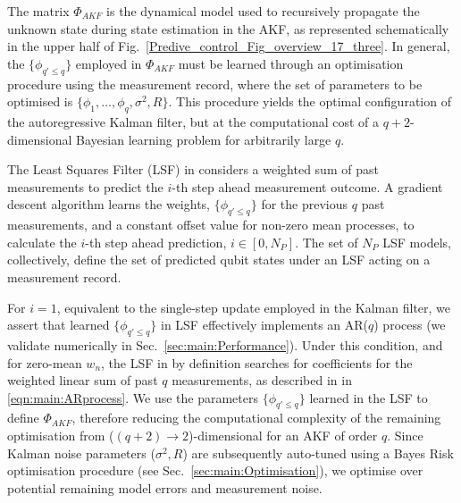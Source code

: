 The matrix $\Phi_{AKF}$ is the dynamical model used to recursively propagate the unknown state during state estimation in the AKF, as represented schematically in the upper half of Fig.~\ref{Predive_control_Fig_overview_17_three}. In general, the $\{\phi_{q' \leq q}\}$ employed in $\Phi_{AKF}$ must be learned through an optimisation procedure using the measurement record, where the set of parameters to be optimised is $\{\phi_1, \hdots, \phi_q, \sigma^2, R \}$. This procedure yields the optimal configuration of the autoregressive Kalman filter, but at the computational cost of a $q+2$-dimensional Bayesian learning problem for arbitrarily large $q$.

The Least Squares Filter (LSF) in \cite{mavadia2017} considers a weighted sum of past measurements to predict the $i$-th step ahead measurement outcome. A gradient descent algorithm learns the weights, $\{\phi_{q' \leq q}\}$ for the previous $q$ past measurements, and a constant offset value for non-zero mean processes, to calculate the $i$-th step ahead prediction, $i \in [0, N_P]$. The set of $N_P$ LSF models, collectively, define the set of predicted qubit states under an LSF acting on a measurement record.

For $i=1$, equivalent to the single-step update employed in the Kalman filter, we assert that learned $\{\phi_{q' \leq q}\}$ in LSF effectively implements an AR($q$) process (we validate numerically in Sec.~\ref{sec:main:Performance}). Under this condition, and for zero-mean $w_n$, the LSF in \cite{mavadia2017} by definition searches for coefficients for the weighted linear sum of past $q$ measurements, as described in in \cref{eqn:main:ARprocess}. We use the parameters $\{\phi_{q' \leq q}\}$ learned in the LSF to define $\Phi_{AKF}$, therefore reducing the computational complexity of the remaining optimisation from ($(q+2)\to 2$)-dimensional for an AKF of order $q$. Since Kalman noise parameters ($\sigma^2, R$) are subsequently auto-tuned using a Bayes Risk optimisation procedure (see Sec.~\ref{sec:main:Optimisation}), we optimise over potential remaining model errors and measurement noise.  

